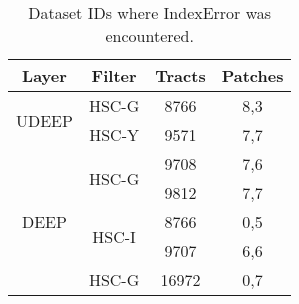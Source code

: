 \begin{table}[h]
\centering
\begin{tabular} {|c|c|c|c|}
\hline
Layer & Filter & Tracts  & Patches  \\
\hline

\multirow{2}{*}{UDEEP} & HSC-G                  & 8766  & 8,3 \\ \cline{2-4}
                       & HSC-Y                  & 9571  & 7,7 \\ \hline
\multirow{5}{*}{DEEP}  & \multirow{2}{*}{HSC-G} & 9708  & 7,6 \\ \cline{3-4}
                       &                        & 9812  & 7,7 \\ \cline{2-4}
                       & \multirow{2}{*}{HSC-I} & 8766  & 0,5 \\ \cline{3-4}
                       &                        & 9707  & 6,6 \\ \hline
WIDE                   & HSC-G                  & 16972 & 0,7 \\
\hline
\end{tabular}
\caption{Dataset IDs where IndexError was encountered.}
\label{IndexErrorTable}
\end{table}
